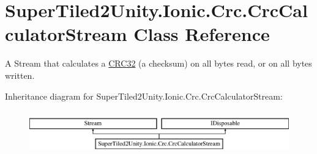 \hypertarget{class_super_tiled2_unity_1_1_ionic_1_1_crc_1_1_crc_calculator_stream}{}\section{Super\+Tiled2\+Unity.\+Ionic.\+Crc.\+Crc\+Calculator\+Stream Class Reference}
\label{class_super_tiled2_unity_1_1_ionic_1_1_crc_1_1_crc_calculator_stream}


A Stream that calculates a \mbox{\hyperlink{class_super_tiled2_unity_1_1_ionic_1_1_crc_1_1_c_r_c32}{C\+R\+C32}} (a checksum) on all bytes read, or on all bytes written.  


Inheritance diagram for Super\+Tiled2\+Unity.\+Ionic.\+Crc.\+Crc\+Calculator\+Stream\+:\begin{figure}[H]
\begin{center}
\leavevmode
\includegraphics[height=1.904762cm]{class_super_tiled2_unity_1_1_ionic_1_1_crc_1_1_crc_calculator_stream}
\end{center}
\end{figure}
